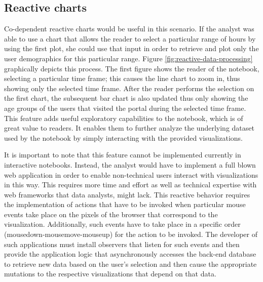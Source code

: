 \subsection*{Reactive charts} Co-dependent reactive charts would be useful in this scenario. If the analyst was able to use a chart that allows the reader to select a particular range of hours by using the first plot, she could use that input in order to retrieve and plot only the user demographics for this particular range.  Figure \ref{fig:reactive-data-processing} graphically depicts this process. The first figure shows the reader of the notebook, selecting a particular time frame; this causes the line chart to zoom in, thus showing only the selected time frame. After the reader performs the selection on the first chart, the subsequent bar chart is also updated thus only showing the age groups of the users that visited the portal during the selected time frame. This feature adds useful exploratory capabilities to the notebook, which is of great value to readers. It enables them to further analyze the underlying dataset used by the notebook by simply interacting with the provided visualizations. 

It is important to note that this feature cannot be implemented currently in interactive notebooks. Instead, the analyst would have to implement a full blown web application in order to enable non-technical users interact with visualizations in this way. This requires more time and effort as well as technical expertise with web frameworks that data analysts, might lack. This reactive behavior requires the implementation of actions that have to be invoked when particular mouse events take place on the pixels of the browser that correspond to the visualization. Additionally, such events have to take place in a specific order (mousedown-mousemove-mouseup) for the action to be invoked. The developer of such applications must install observers that listen for such events and then provide the application logic that asynchronously accesses the back-end database to retrieve new data based on the user's selection and then cause the appropriate mutations to the respective visualizations that depend on that data. 


